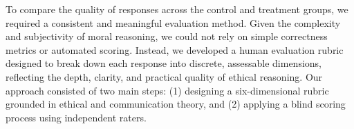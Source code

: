 To compare the quality of responses across the control and treatment groups, we required a consistent and meaningful evaluation method. Given the complexity and subjectivity of moral reasoning, we could not rely on simple correctness metrics or automated scoring.
Instead, we developed a human evaluation rubric designed to break down each response into discrete, assessable dimensions, reflecting the depth, clarity, and practical quality of ethical reasoning.
Our approach consisted of two main steps: (1) designing a six-dimensional rubric grounded in ethical and communication theory, and (2) applying a blind scoring process using independent raters.







